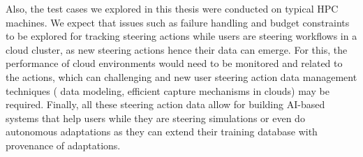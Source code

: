 Also,  the test cases we explored in this thesis were conducted on typical HPC machines. We expect that issues such as failure handling and budget constraints to be explored for tracking steering actions while users are steering workflows in a cloud cluster, as new steering actions hence their data can emerge. For this, the performance of cloud environments would need to be monitored and related to the actions, which can  challenging and new user steering action data management techniques (\eg{} data modeling, efficient capture mechanisms in clouds) may be required.
Finally, all these
steering action data allow for building AI-based systems that help users
while they are steering simulations \cite{Silva2018JobPruner:} or even do autonomous adaptations
as they can extend their training database with provenance of
adaptations. 


